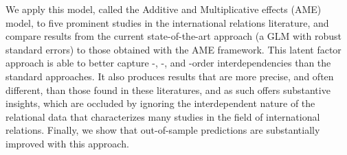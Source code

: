 
We apply this model, called the Additive and Multiplicative effects (AME) model, to five prominent studies in the international relations literature, and compare results from the current state-of-the-art approach (a GLM with robust standard errors) to those obtained with the AME framework. This latent factor approach is able to better capture \first-, \second-, and \third-order interdependencies than the standard approaches. It also produces results that are more precise, and often different, than those found in these literatures, and as such offers substantive insights, which are occluded by ignoring the interdependent nature of the relational data that characterizes many studies in the field of international relations. Finally, we show that out-of-sample predictions are substantially improved with this approach.  